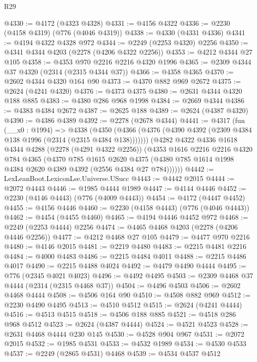\begin{lexlean}{R29}
\begin{coremodule}
@4330 := @4172 (@4323 @4328)
@4331 := @4156 @4322
@4336 := @2230 (@4158 @4319) (@776 (@4046 @4319))
@4338 := @4330 (@4331 @4336)
@4341 := @4194 @4322 @4328 @972
@4344 := @2249 (@2253 @4320) @2256
@4350 := @4341 @4344 @4203 (@2278 (@4206 @4322 @2256))
@4353 := @4212 @4344 @27 @105
@4358 := @4353 @970 @2216 @2216 @4320 @1996
@4365 := @2309 @4344 @37 @4320 (@2314 (@2315 @4344 @37))
@4366 := @4358 @4365
@4370 := @2602 @4344 @4320 @164 @90
@4373 := @4370 @882 @969 @2672
@4375 := @2624 (@4241 @4320)
@4376 := @4373 @4375
@4380 := @2631 @4344 @4320 @188 @885
@4383 := @4380 @286 @968 @1998
@4384 := @2669 @4344
@4386 := @4383 @4384 @2672
@4387 := @2625 @188
@4389 := @2624 (@4387 @4320)
@4390 := @4386 @4389
@4392 := @2278 (@2678 @4344)
@4441 := @4317
    (fun (__x0 : @1994) =>
    @4338
      (@4350 (@4366 (@4376 (@4390 @4392 (@2309 @4384 @138 @1996 (@2314 (@2315 @4384 @138)))))))
      (@4282
        @4322
        @4336
        @1618
        @4344
        @4288
        (@2278 (@4291 @4322 @2256))
        (@4353
          @1616
          @2216
          @2216
          @4320
          @784
          @4365
          (@4370
            @785
            @1615
            @2620
            @4375
            (@4380 @785 @1614 @1998 @4384 @2620 @4389 @4392 (@2556 @4384 @27 @784))))))
@4442 := LexLeanBoot.LexiconLse.Universe.USucc
@4443 := @4442 @2015
@4444 := @2072 @4443
@4446 := @1985 @4444 @1989
@4447 := @4144 @4446
@4452 := @2230 (@4146 @4443) (@776 (@4009 @4443))
@4454 := @4172 (@4447 @4452)
@4455 := @4156 @4446
@4460 := @2230 (@4158 @4443) (@776 (@4046 @4443))
@4462 := @4454 (@4455 @4460)
@4465 := @4194 @4446 @4452 @972
@4468 := @2249 (@2253 @4444) @2256
@4474 := @4465 @4468 @4203 (@2278 (@4206 @4446 @2256))
@4477 := @4212 @4468 @27 @105
@4479 := @4477 @970 @2216
@4480 := @4146 @2015
@4481 := @2219 @4480
@4483 := @2215 @4481 @2216
@4484 := @4000 @4483
@4486 := @2215 @4484 @4011
@4488 := @2215 @4486 @4017
@4490 := @2215 @4488 @4024
@4492 := @4479 @4490 @4444
@4495 := @776 (@2345 @4021 @4023)
@4496 := @4492 @4495
@4503 := @2309 @4468 @37 @4444 (@2314 (@2315 @4468 @37))
@4504 := @4496 @4503
@4506 := @2602 @4468 @4444
@4508 := @4506 @164 @90
@4510 := @4508 @882 @969
@4512 := @2230 @4490 @4495
@4513 := @4510 @4512
@4515 := @2624 (@4241 @4444)
@4516 := @4513 @4515
@4518 := @4506 @188 @885
@4521 := @4518 @286 @968 @4512
@4523 := @2624 (@4387 @4444)
@4524 := @4521 @4523
@4528 := @2631 @4468 @4444 @230 @145
@4530 := @4528 @904 @967
@4531 := @2072 @2015
@4532 := @1985 @4531
@4533 := @4532 @1989
@4534 := @4530 @4533
@4537 := @2249 (@2865 @4531) @4468
@4539 := @4534 @4537 @4512

\end{coremodule}
\end{lexlean}
